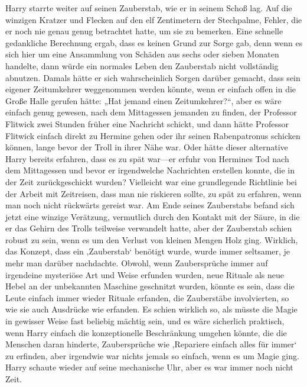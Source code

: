 Harry starrte weiter auf seinen Zauberstab, wie er in seinem Schoß lag. Auf die winzigen Kratzer und Flecken auf den elf Zentimetern der Stechpalme, Fehler, die er noch nie genau genug betrachtet hatte, um sie zu bemerken. Eine schnelle gedankliche Berechnung ergab, dass es keinen Grund zur Sorge gab, denn wenn es sich hier um eine Ansammlung von Schäden aus sechs oder sieben Monaten handelte, dann würde ein normales Leben den Zauberstab nicht vollständig abnutzen. Damals hätte er sich wahrscheinlich Sorgen darüber gemacht, dass sein eigener Zeitumkehrer weggenommen werden könnte, wenn er einfach offen in die Große Halle gerufen hätte: „Hat jemand einen Zeitumkehrer?“, aber es wäre einfach genug gewesen, nach dem Mittagessen jemanden zu finden, der Professor Flitwick zwei Stunden früher eine Nachricht schickt, und dann hätte Professor Flitwick einfach direkt zu Hermine gehen oder ihr seinen Rabenpatronus schicken können, lange bevor der Troll in ihrer Nähe war. Oder hätte dieser alternative Harry bereits erfahren, dass es zu spät war—er erfuhr von Hermines Tod nach dem Mittagessen und bevor er irgendwelche Nachrichten erstellen konnte, die in der Zeit zurückgeschickt wurden? Vielleicht war eine grundlegende Richtlinie bei der Arbeit mit Zeitreisen, dass man nie riskieren sollte, zu spät zu erfahren, wenn man noch nicht rückwärts gereist war.
Am Ende seines Zauberstabs befand sich jetzt eine winzige Verätzung, vermutlich durch den Kontakt mit der Säure, in die er das Gehirn des Trolls teilweise verwandelt hatte, aber der Zauberstab schien robust zu sein, wenn es um den Verlust von kleinen Mengen Holz ging. Wirklich, das Konzept, dass ein ‚Zauberstab‘ benötigt wurde, wurde immer seltsamer, je mehr man darüber nachdachte. Obwohl, wenn Zaubersprüche immer auf irgendeine mysteriöse Art und Weise erfunden wurden, neue Rituale als neue Hebel an der unbekannten Maschine geschnitzt wurden, könnte es sein, dass die Leute einfach immer wieder Rituale erfanden, die Zauberstäbe involvierten, so wie sie auch Ausdrücke wie  erfanden. Es schien wirklich so, als müsste die Magie in gewisser Weise fast beliebig mächtig sein, und es wäre sicherlich praktisch, wenn Harry einfach die konzeptionelle Beschränkung umgehen könnte, die die Menschen daran hinderte, Zaubersprüche wie ‚Repariere einfach alles für immer‘ zu erfinden, aber irgendwie war nichts jemals so einfach, wenn es um Magie ging. Harry schaute wieder auf seine mechanische Uhr, aber es war immer noch nicht Zeit.

